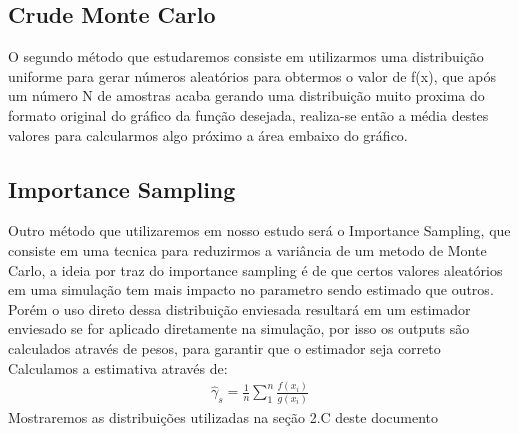 \documentclass[twocolumn,amsmath,amssymb,floatfix]{revtex4}
\begin{document}
\subsection{Crude Monte Carlo}
\indent O segundo método que estudaremos consiste em utilizarmos uma distribuição uniforme para gerar números aleatórios para obtermos o valor de f(x), que após um número N de amostras acaba gerando uma distribuição muito proxima do formato original do gráfico da função desejada, realiza-se então a média destes valores para calcularmos algo próximo a área embaixo do gráfico.
\subsection{Importance Sampling}
\indent Outro método que utilizaremos em nosso estudo será o Importance Sampling, que consiste em uma tecnica para reduzirmos a variância de um metodo de Monte Carlo, a ideia por traz do importance sampling é de que certos valores aleatórios em uma simulação tem mais impacto no parametro sendo estimado que outros. Porém o uso direto dessa distribuição enviesada resultará em um estimador enviesado se for aplicado diretamente na simulação, por isso os outputs são calculados através de pesos, para garantir que o estimador seja correto\\
\indent Calculamos a estimativa através de:
\begin{eqnarray}
  \hat\gamma_s = \frac{1}{n}\sum_1^n\frac{f(x_i)}{g(x_i)}
\end{eqnarray}
\indent Mostraremos as distribuições utilizadas na seção 2.C deste documento
\end{document}
